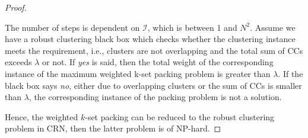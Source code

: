 \documentclass[times]{ettauth}
\newcommand{\ie}{i.e., }
\theoremstyle{mytheoremstyle}
\theoremstyle{mytheoremstyle}
\theoremstyle{mytheoremstyle}
\begin{document}
\begin{proof}
\begin{itemize}

\end{itemize}
The number of steps is dependent on $\mathcal{I}$, which is between 1 and $N^2$.
%
Assume we have a robust clustering black box which checks whether the clustering instance meets the requirement, \ie clusters are not overlapping and the total sum of CCs exceeds $\lambda$ or not.
If \textit{yes} is said, then the total weight of the corresponding instance of the maximum weighted k-set packing problem is greater than $\lambda$.
If the black box says \textit{no}, either due to overlapping clusters or the sum of CCs is smaller than $\lambda$, the corresponding instance of the packing problem is not a solution.


Hence, the weighted $k$-set packing can be reduced to the robust clustering problem in CRN, then the latter problem is of NP-hard.



\end{proof}







\end{document}
